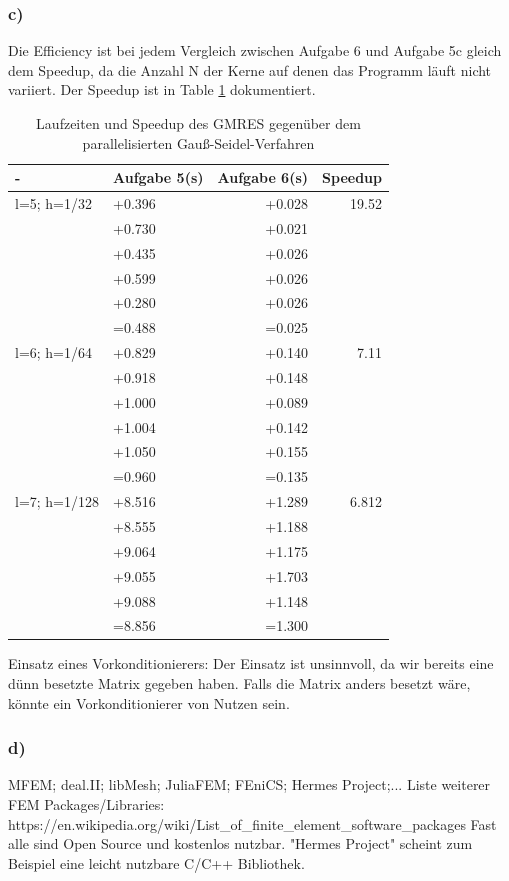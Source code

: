 \documentclass{report}
\begin{document}
	\subsubsection{c)}
Die Efficiency ist bei jedem Vergleich zwischen Aufgabe 6 und Aufgabe 5c gleich dem Speedup, da die Anzahl N der Kerne auf denen das Programm läuft nicht variiert. Der Speedup ist in Table \ref{Table:6c} dokumentiert.\\
\begin{table}
\begin{tabular}{|l|l|r|r|}
		\hline
		- & Aufgabe 5(s) & Aufgabe 6(s) & Speedup\\
		\hline
		l=5; h=1/32 &  +0.396 & +0.028 &  19.52 \\
		& +0.730 & +0.021 &    \\
		& +0.435 & +0.026 &    \\
		& +0.599 & +0.026 &    \\
		& +0.280 & +0.026 &   \\
		&=0.488 & =0.025  & \\
		\hline
		l=6; h=1/64 &  +0.829 & +0.140 &  7.11 \\
		& +0.918 & +0.148 &    \\
		& +1.000 & +0.089 &    \\
		& +1.004 & +0.142 &    \\
		& +1.050 & +0.155 &   \\
		&=0.960 & =0.135  & \\
		\hline
		l=7; h=1/128 &  +8.516 & +1.289 & 6.812 \\
		& +8.555 & +1.188 &    \\
		& +9.064 & +1.175 &    \\
		& +9.055 & +1.703 &    \\
		& +9.088 & +1.148 &   \\
		&=8.856 & =1.300 & \\
		\hline
	\end{tabular}
	\caption{Laufzeiten und Speedup des GMRES gegenüber dem parallelisierten Gauß-Seidel-Verfahren}
	\label{Table:6c}
\end{table}
Einsatz eines Vorkonditionierers: Der Einsatz ist unsinnvoll, da wir bereits eine d\"{u}nn besetzte Matrix gegeben haben. Falls die Matrix anders besetzt wäre, könnte ein Vorkonditionierer von Nutzen sein.
	\subsubsection{d)}
MFEM; deal.II; libMesh; JuliaFEM; FEniCS; Hermes Project;...\newline
Liste weiterer FEM Packages/Libraries: https://en.wikipedia.org/wiki/List\_of\_finite\_element\_software\_packages \newline
Fast alle sind Open Source und kostenlos nutzbar. "Hermes Project" scheint zum Beispiel eine leicht nutzbare C/C++ Bibliothek.
\end{document}
